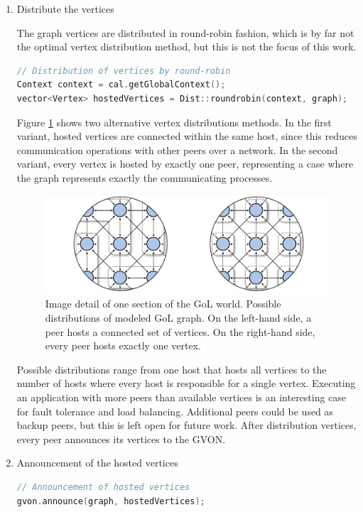 \begin{enumerate}
\begin{enumerate}
\item Distribute the vertices

  The graph vertices are distributed in round-robin fashion, which
  is by far not the optimal vertex distribution method, but this is not the
  focus of this work.

  \begin{lstlisting}[language=C++, label=lst:gol_distribution, caption={}]
// Distribution of vertices by round-robin
Context context = cal.getGlobalContext();
vector<Vertex> hostedVertices = Dist::roundrobin(context, graph);
  \end{lstlisting}

  \noindent Figure
  \ref{fig:gol_mapping} shows two alternative vertex distributions
  methods.  In the first variant, hosted vertices are connected
  within the same host, since this reduces communication operations
  with other peers over a network.  In the second variant, every vertex is
  hosted by exactly one peer, representing a case where the graph
  represents exactly the communicating processes.

  \begin{figure}[H]
    \centering
    \includegraphics[width=\textwidth]{graphics/40_gol_mapping}
    \caption{Image detail of one section of the GoL world. Possible
      distributions of modeled GoL graph. On the left-hand side, a
      peer hosts a connected set of vertices. On the right-hand side,
      every peer hosts exactly one vertex.}
    \label{fig:gol_mapping}
  \end{figure}

  \noindent Possible distributions range from one host that hosts all
  vertices to the number of hosts where every host is responsible for a single
  vertex. Executing an application with more peers than available
  vertices is an interesting case for fault tolerance and load
  balancing.  Additional peers could be used as backup peers, but this
  is left open for future work.  After distribution vertices, every
  peer announces its vertices to the GVON.

\item Announcement of the hosted vertices
  \begin{lstlisting}[language=C++, label=lst:gol_announce, caption={}]
// Announcement of hosted vertices
gvon.announce(graph, hostedVertices);
  \end{lstlisting}
  \end{enumerate}
\end{enumerate}

